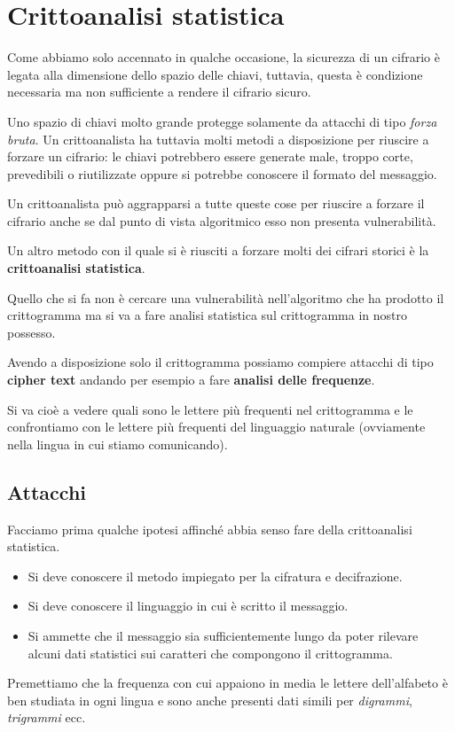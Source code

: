 \section{Crittoanalisi statistica}
Come abbiamo solo accennato in qualche occasione, la sicurezza di un cifrario \`e legata alla dimensione dello spazio
delle chiavi, tuttavia, questa \`e condizione necessaria ma non sufficiente a rendere il cifrario sicuro.

Uno spazio di chiavi molto grande protegge solamente da attacchi di tipo \emph{forza bruta}. Un crittoanalista ha tuttavia
molti metodi a disposizione per riuscire a forzare un cifrario: le chiavi potrebbero essere generate male, troppo corte,
prevedibili o riutilizzate oppure si potrebbe conoscere il formato del messaggio.

Un crittoanalista pu\`o aggrapparsi a tutte queste cose per riuscire a forzare il cifrario anche se dal punto di vista
algoritmico esso non presenta vulnerabilit\`a.

Un altro metodo con il quale si \`e riusciti a forzare molti dei cifrari storici \`e la \textbf{crittoanalisi statistica}.

Quello che si fa non \`e cercare una vulnerabilit\`a nell'algoritmo che ha prodotto il crittogramma ma si va a fare
analisi statistica sul crittogramma in nostro possesso.

Avendo a disposizione solo il crittogramma possiamo compiere attacchi di tipo \textbf{cipher text} andando per esempio
a fare \textbf{analisi delle frequenze}.

Si va cio\`e a vedere quali sono le lettere pi\`u frequenti nel crittogramma e le confrontiamo con le lettere pi\`u
frequenti del linguaggio naturale (ovviamente nella lingua in cui stiamo comunicando).

\subsection{Attacchi}
Facciamo prima qualche ipotesi affinch\'e abbia senso fare della crittoanalisi statistica.
\begin{itemize}
	\item Si deve conoscere il metodo impiegato per la cifratura e decifrazione.
	\item Si deve conoscere il linguaggio in cui \`e scritto il messaggio.
	\item Si ammette che il messaggio sia sufficientemente lungo da poter rilevare alcuni dati statistici sui caratteri
	      che compongono il crittogramma.
\end{itemize}
Premettiamo che la frequenza con cui appaiono in media le lettere dell'alfabeto \`e ben studiata in ogni lingua e sono
anche presenti dati simili per \emph{digrammi}, \emph{trigrammi} ecc.

